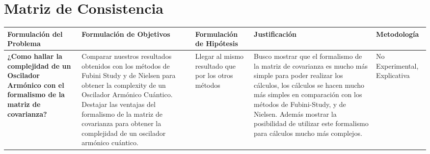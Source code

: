 \documentclass[../Main.tex]{subfiles}
\begin{document}
\section{Matriz de Consistencia}

\begin{table}[!ht]
\begin{center}
\begin{tabular}{| m{5em} | m{5em} | m{5em} | m{5em} | m{5em} |}
\hline
Formulación del Problema & Formulación de Objetivos & Formulación de Hipótesis & Justificación & Metodología \\
\hline \hline
\textbf{¿Como hallar la complejidad de un Oscilador Armónico con el formalismo de la matriz de covarianza?} & Comparar nuestros resultados obtenidos con los métodos de Fubini Study y de Nielsen para obtener la complexity de un Oscilador Armónico Cuántico. Destajar las ventajas del formalismo de la matriz de covarianza para obtener la complejidad de un oscilador armónico cuántico. & Llegar al mismo resultado que por los otros métodos & Busco mostrar que el formalismo de la matriz de covarianza es mucho más simple para poder realizar los cálculos, los cálculos se hacen mucho más simples en comparación con los métodos de Fubini-Study, y de Nielsen. Además mostrar la posibilidad de utilizar este formalismo para cálculos mucho más complejos. & No Experimental, Explicativa \\
\hline
\end{tabular}
\end{center}
\end{table}

\biblio %
\end{document}
